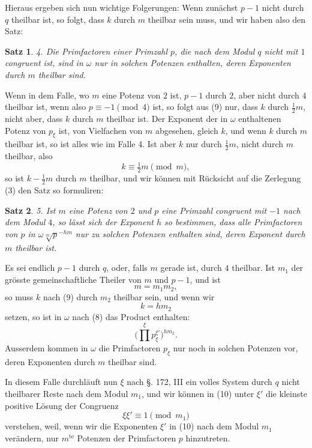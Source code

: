 \documentclass[12pt,a4paper]{article}
\newtheorem*{satz}{Satz}
\begin{document}
Hieraus ergeben sich nun wichtige Folgerungen: Wenn zunächst $p-1$ nicht durch $q$ theilbar ist, so folgt, dass $k$ durch $m$ theilbar sein muss, und wir haben also den Satz:

\begin{satz}
4. Die Primfactoren einer Primzahl $p$, die nach dem Modul $q$ nicht mit $1$ congruent ist, sind in $\omega$ nur in solchen Potenzen enthalten, deren Exponenten durch $m$ theilbar sind.
\end{satz}

Wenn in dem Falle, wo $m$ eine Potenz von $2$ ist, $p-1$ durch $2$, aber nicht durch $4$ theilbar ist, wenn also $p \equiv -1 \pmod{4}$ ist, so folgt aus (9) nur, dass $k$ durch $\frac{1}{2}m$, nicht aber, dass $k$ durch $m$ theilbar ist. Der Exponent der in $\omega$ enthaltenen Potenz von $p_\xi$ ist, von Vielfachen von $m$ abgesehen, gleich $k$, und wenn $k$ durch $m$ theilbar ist, so ist alles wie im Falle 4. Ist aber $k$ nur durch $\frac{1}{2}m$, nicht durch $m$ theilbar, also
\[
k \equiv \tfrac{1}{2}m \pmod{m},
\]
so ist $k - \frac{1}{2}m$ durch $m$ theilbar, und wir können mit Rücksicht auf die Zerlegung (3) den Satz so formuliren:

\begin{satz}
5. Ist $m$ eine Potenz von $2$ und $p$ eine Primzahl congruent mit $-1$ nach dem Modul $4$, so lässt sich der Exponent $h$ so bestimmen, dass alle Primfactoren von $p$ in $\omega\sqrt[m]{p}^{-hm}$ nur zu solchen Potenzen enthalten sind, deren Exponent durch $m$ theilbar ist.
\end{satz}

Es sei endlich $p-1$ durch $q$, oder, falls $m$ gerade ist, durch $4$ theilbar. Ist $m_1$ der grösste gemeinschaftliche Theiler von $m$ und $p-1$, und ist
\[
m = m_1 m_2,
\]
so muss $k$ nach (9) durch $m_2$ theilbar sein, und wenn wir
\[
k = h m_2
\]
setzen, so ist in $\omega$ nach (8) das Product enthalten:
\begin{equation}\label{eq:181-10}
\bigl(\prod^\xi p_\xi^{\xi'}\bigr)^{hm_2}.
\end{equation}
Ausserdem kommen in $\omega$ die Primfactoren $p_\xi$ nur noch in solchen Potenzen vor, deren Exponenten durch $m$ theilbar sind.

In diesem Falle durchläuft nun $\xi$ nach \S. 172, III ein volles System durch $q$ nicht theilbarer Reste nach dem Modul $m_1$, und wir können in (10) unter $\xi'$ die kleinste positive Lösung der Congruenz
\[
\xi\xi' \equiv 1 \pmod{m_1}
\]
verstehen, weil, wenn wir die Exponenten $\xi'$ in (10) nach dem Modul $m_1$ verändern, nur $m^{\text{te}}$ Potenzen der Primfactoren $p$ hinzutreten.
\end{document}

